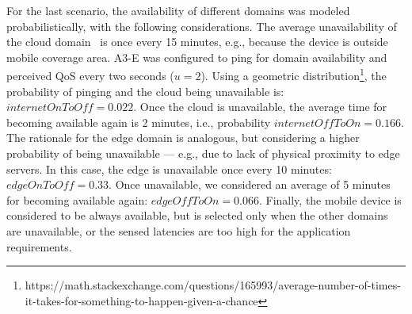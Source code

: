 For the last scenario, the availability of different domains was modeled probabilistically, with the following considerations. The average unavailability of the cloud domain~\cite{garcia2017bandwidth} is once every 15 minutes, e.g., because the device is outside mobile coverage area. A3-E was configured to ping for domain availability and perceived QoS every two seconds ($u = 2$). Using a geometric distribution\footnote{https://math.stackexchange.com/questions/165993/average-number-of-times-it-takes-for-something-to-happen-given-a-chance}, the probability of pinging and the cloud being unavailable is: $internetOnToOff=0.022$. Once the cloud is unavailable, the average time for becoming available again is 2 minutes, i.e., probability $internetOffToOn=0.166$. The rationale for the edge domain is analogous, but considering a higher probability of being unavailable --- e.g., due to lack of physical proximity to edge servers. In this case, the edge is unavailable once every 10 minutes: $edgeOnToOff = 0.33$. Once unavailable, we considered an average of 5 minutes for becoming available again: $edgeOffToOn=0.066$. Finally, the mobile device is considered to be always available, but is selected only when the other domains are unavailable, or the sensed latencies are too high for the application requirements.

